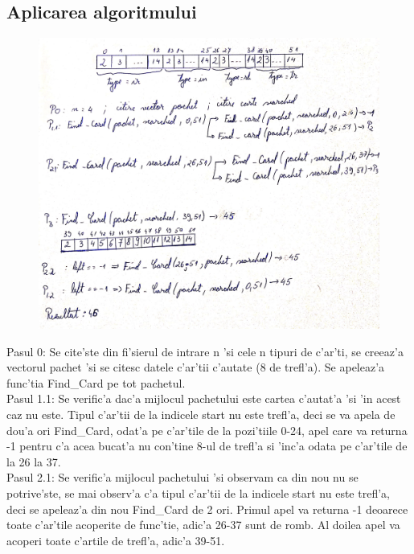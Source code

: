 \subsection{Aplicarea algoritmului}
\begin{figure}[H]
\centering
\includegraphics[scale = 0.17]{Divide et Impera/Exemplu}
\end{figure}
\vspace{10mm}
Pasul 0: Se cite'ste din fi'sierul de intrare n 'si cele n tipuri de c'ar'ti, se creeaz'a vectorul pachet 'si se citesc datele c'ar'tii c'autate (8 de trefl'a). Se apeleaz'a func'tia Find\_Card pe tot pachetul.\\
\newline
Pasul 1.1: Se verific'a dac'a mijlocul pachetului este cartea c'autat'a 'si 'in acest caz nu este. Tipul c'ar'tii de la indicele start nu este trefl'a, deci se va apela de dou'a ori Find\_Card, odat'a pe c'ar'tile de la pozi'tiile 0-24, apel care va returna -1 pentru c'a acea bucat'a nu con'tine 8-ul de trefl'a si 'inc'a odata pe c'ar'tile de la 26 la 37.\\
\newline
Pasul 2.1: Se verific'a mijlocul pachetului 'si observam ca din nou nu se potrive'ste, se mai observ'a c'a tipul c'ar'tii de la indicele start nu este trefl'a, deci se apeleaz'a din nou Find\_Card de 2 ori. Primul apel va returna -1 deoarece toate c'ar'tile acoperite de func'tie, adic'a 26-37 sunt de romb. Al doilea apel va acoperi toate c'artile de trefl'a, adic'a 39-51.\\
